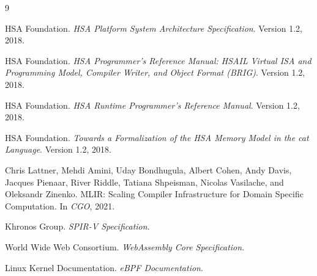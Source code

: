 \documentclass[11pt]{article}
\begin{document}
\begin{thebibliography}{9}

HSA Foundation.
\newblock \emph{HSA Platform System Architecture Specification}.
\newblock Version 1.2, 2018.

HSA Foundation.
\newblock \emph{HSA Programmer's Reference Manual: HSAIL Virtual ISA and
Programming Model, Compiler Writer, and Object Format (BRIG)}.
\newblock Version 1.2, 2018.

HSA Foundation.
\newblock \emph{HSA Runtime Programmer's Reference Manual}.
\newblock Version 1.2, 2018.

HSA Foundation.
\newblock \emph{Towards a Formalization of the HSA Memory Model in the cat
Language}.
\newblock Version 1.2, 2018.

Chris Lattner, Mehdi Amini, Uday Bondhugula, Albert Cohen, Andy Davis,
Jacques Pienaar, River Riddle, Tatiana Shpeisman, Nicolas Vasilache, and
Oleksandr Zinenko.
\newblock MLIR: Scaling Compiler Infrastructure for Domain Specific
Computation.
\newblock In \emph{CGO}, 2021.

Khronos Group.
\newblock \emph{SPIR-V Specification}.

World Wide Web Consortium.
\newblock \emph{WebAssembly Core Specification}.

Linux Kernel Documentation.
\newblock \emph{eBPF Documentation}.

\end{thebibliography}
\end{document}
